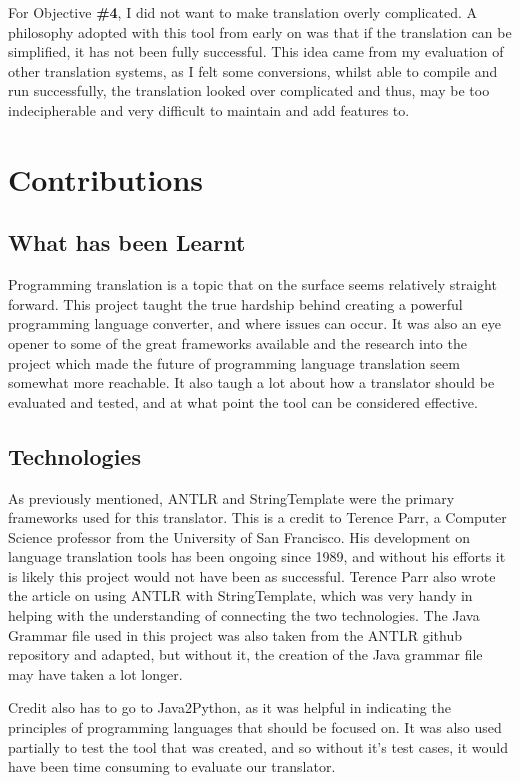 \documentclass{l4proj}
\begin{document}
For Objective \textbf{\#4}, I did not want to make translation overly complicated. A philosophy adopted with this tool from early on was that if the translation can be simplified, it has not been fully successful. This idea came from my evaluation of other translation systems, as I felt some conversions, whilst able to compile and run successfully, the translation looked over complicated and thus, may be too indecipherable and very difficult to maintain and add features to.

\section{Contributions}

\subsection{What has been Learnt}

Programming translation is a topic that on the surface seems relatively straight forward. This project taught the true hardship behind creating a powerful programming language converter, and where issues can occur. It was also an eye opener to some of the great frameworks available and the research into the project which made the future of programming language translation seem somewhat more reachable. It also taugh a lot about how a translator should be evaluated and tested, and at what point the tool can be considered effective.

\subsection{Technologies}
As previously mentioned, ANTLR and StringTemplate were the primary frameworks used for this translator. This is a credit to Terence Parr, a Computer Science professor from the University of San Francisco. His development on language translation tools has been ongoing since 1989, and without his efforts it is likely this project would not have been as successful.
Terence Parr also wrote the article on using ANTLR with StringTemplate, which was very handy in helping with the understanding of connecting the two technologies.
The Java Grammar file used in this project was also taken from the ANTLR github repository and adapted, but without it, the creation of the Java grammar file may have taken a lot longer.

Credit also has to go to Java2Python, as it was helpful in indicating the principles of programming languages that should be focused on. It was also used partially to test the tool that was created, and so without it's test cases, it would have been time consuming to evaluate our translator.
\end{document}
